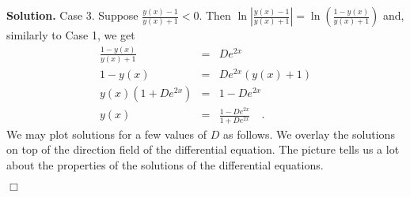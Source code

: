 \documentclass[12pt]{book}
\newenvironment{solution}{\textbf{Solution.} }{$\Box$}
\newcommand{\optionalDisplay}[1]{}
\begin{document}
\begin{solution}
Case 3. Suppose  $\frac{y(x)-1}{y(x)+1}<0$. Then $\ln \left|\frac{y(x)-1}{y(x)+1}\right|= \ln \left(\frac{1-y(x)}{y(x)+1}\right)$ and, similarly to Case 1, we get 
\[
\begin{array}{rcl}
\frac{1-y(x)}{y(x)+1}&=& D e^{2x}\\
1-y(x)&=& De^{2x}(y(x)+1)\\
y(x)(1+ De^{2x})&=& 1-De^{2x}\\
y(x)&=&\frac{1- De^{2x}}{1+ De^{2x}}\quad .
\end{array}
\]
We may plot solutions for a few values of $D$ as follows. We overlay the solutions on top of the direction field of the differential equation. The picture tells us a lot about the properties of the solutions of the differential equations. 
\optionalDisplay{
\begin{pspicture}(-6,-6)(6,6)
\newcommand{\Dconst}{1}
\psplot[linecolor=green]{-4}{4}{1 \Dconst\space 2.718281828 2 x mul exp mul sub 1 \Dconst\space 2.718281828 2 x mul exp mul add div} 
\renewcommand{\Dconst}{0.25}
\psplot[linecolor=green]{-4}{4}{1 \Dconst\space 2.718281828 2 x mul exp mul sub 1 \Dconst\space 2.718281828 2 x mul exp mul add div} 
\renewcommand{\Dconst}{4}
\psplot[linecolor=green]{-4}{4}{1 \Dconst\space 2.718281828 2 x mul exp mul sub 1 \Dconst\space 2.718281828 2 x mul exp mul add div} 
\rput[l](5,2 ){$\frac{1- \frac{1}4 e^{2x}}{1+\frac 14 e^{2x}}$ }
\rput[l](5,0.5 ){$\frac{1- e^{2x}}{1+e^{2x}}$ }
\rput[l](5,-2 ){$\frac{1- 4e^{2x}}{1+4e^{2x}}$ }
\psline[arrows=->, linestyle=dotted](5,2)(0,0.6)
\psline[arrows=->, linestyle=dotted](5,0.5)(0,0)
\psline[arrows=->, linestyle=dotted](5,-2)(0,-0.6)

\renewcommand{\Dconst}{1}
\psplot[linecolor=green]{-4}{-0.17}{1 \Dconst\space 2.718281828 2 x mul exp mul add 1 \Dconst\space 2.718281828 2 x mul exp mul sub  div} 
\psplot[linecolor=green]{0.17}{4}{1 \Dconst\space 2.718281828 2 x mul exp mul add 1 \Dconst\space 2.718281828 2 x mul exp mul sub  div} 
\renewcommand{\Dconst}{4}

\psplot[linecolor=green]{-4}{-0.863147181}{1 \Dconst\space 2.718281828 2 x mul exp mul add 1 \Dconst\space 2.718281828 2 x mul exp mul sub  div} 
\psplot[linecolor=green]{-0.523147181}{4}{1 \Dconst\space 2.718281828 2 x mul exp mul add 1 \Dconst\space 2.718281828 2 x mul exp mul sub  div} 


\end{pspicture}}
\end{solution}
\end{document}

